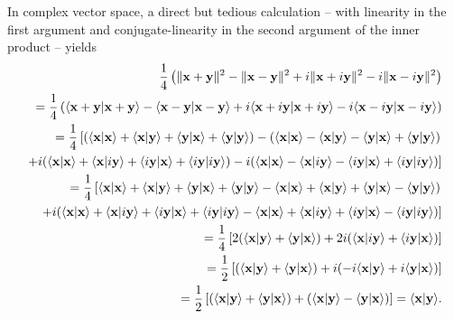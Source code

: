 {\color{OliveGreen}
\bproof
In complex vector space,  a direct but tedious calculation
-- with linearity in the first argument and conjugate-linearity in the second argument of the inner product -- yields
\begin{equation}
\begin{split}
\frac{1}{4}\left(
\|  {\bf x}+ {\bf y} \|^2
-
\|  {\bf x}- {\bf y} \|^2
+ i
\|  {\bf x}+ i{\bf y} \|^2
- i
\|  {\bf x}- i{\bf y} \|^2
\right)
\\
=
\frac{1}{4}\left(
\langle {\bf x}+ {\bf y} \vert {\bf x}+ {\bf y}\rangle
-
\langle {\bf x}- {\bf y} \vert {\bf x}- {\bf y}\rangle
+ i
\langle {\bf x}+ i{\bf y} \vert {\bf x}+ i{\bf y}\rangle
- i
\langle {\bf x}- i{\bf y} \vert {\bf x} -i {\bf y}\rangle
\right)
\\
=
\frac{1}{4}\left[
(
\langle {\bf x} \vert {\bf x}\rangle +
\langle {\bf x} \vert {\bf y}\rangle +
\langle {\bf y} \vert  {\bf x}\rangle +
\langle {\bf y} \vert {\bf y}\rangle
)
-
(
\langle {\bf x} \vert {\bf x}\rangle    -
\langle {\bf x} \vert {\bf y}\rangle    -
\langle {\bf y} \vert {\bf x}\rangle    +
\langle {\bf y} \vert {\bf y}\rangle
)
\right.
\\
\left.
+ i
(
\langle {\bf x} \vert {\bf x}\rangle +
\langle {\bf x} \vert  i{\bf y}\rangle  +
\langle i{\bf y} \vert {\bf x}\rangle   +
\langle i{\bf y} \vert i{\bf y}\rangle
)
- i
(
\langle {\bf x} \vert {\bf x}\rangle -
\langle {\bf x} \vert i {\bf y}\rangle  -
\langle i{\bf y} \vert {\bf x}\rangle  +
\langle  i{\bf y} \vert i {\bf y}\rangle
)
\right]
\\
=
\frac{1}{4}\left[
\langle {\bf x} \vert {\bf x}\rangle +
\langle {\bf x} \vert {\bf y}\rangle +
\langle {\bf y} \vert  {\bf x}\rangle +
\langle {\bf y} \vert {\bf y}\rangle
-
\langle {\bf x} \vert {\bf x}\rangle    +
\langle {\bf x} \vert {\bf y}\rangle    +
\langle {\bf y} \vert {\bf x}\rangle    -
\langle {\bf y} \vert {\bf y}\rangle
)
\right.
\\
\left.
+i (
\langle {\bf x} \vert {\bf x}\rangle +
\langle {\bf x} \vert  i{\bf y}\rangle  +
\langle i{\bf y} \vert {\bf x}\rangle   +
\langle i{\bf y} \vert i{\bf y}\rangle
-
\langle {\bf x} \vert {\bf x}\rangle +
\langle {\bf x} \vert i {\bf y}\rangle +
\langle i{\bf y} \vert {\bf x}\rangle  -
\langle  i{\bf y} \vert i {\bf y}\rangle
)
\right]
\\
=
\frac{1}{4}\left[
2 (
\langle {\bf x} \vert {\bf y}\rangle +
\langle {\bf y} \vert  {\bf x}\rangle
)
+2 i (
\langle {\bf x} \vert  i{\bf y}\rangle  +
\langle i{\bf y} \vert {\bf x}\rangle
)
\right]
\\
=
\frac{1}{2}\left[
(
\langle {\bf x} \vert {\bf y}\rangle +
\langle {\bf y} \vert  {\bf x}\rangle
)
+ i (
-i\langle {\bf x} \vert  {\bf y}\rangle  +
i\langle {\bf y} \vert {\bf x}\rangle
)
\right]
\\
=
\frac{1}{2}\left[
(
\langle {\bf x} \vert {\bf y}\rangle +
\langle {\bf y} \vert  {\bf x}\rangle
)
+  (
\langle {\bf x} \vert  {\bf y}\rangle
-\langle {\bf y} \vert {\bf x}\rangle
)
\right]
=
\langle {\bf x} \vert {\bf y}\rangle
.
\end{split}
\label{2015-m-ch-polidc2}
\end{equation}
\eproof
}


